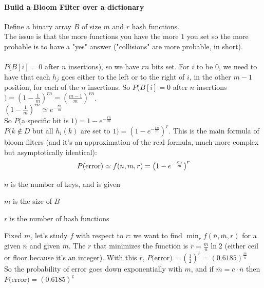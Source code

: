\documentclass[10pt]{report}
\begin{document}
\paragraph{Build a Bloom Filter over a dictionary} Define a binary array $B$ of size $m$ and $r$ hash functions.\\
The issue is that the more functions you have the more $1$ you set so the more probable is to have a "yes" answer ("collisions" are more probable, in short).\\\\
$P(B[i]=0$ after $n$ insertions$)$, so we have $rn$ bits set. For $i$ to be $0$, we need to have that each $h_j$ goes either to the left or to the right of $i$, in the other $m-1$ position, for each of the $n$ insertions. So $P(B[i]=0$ after $n$ insertions$) = \left(1-\frac{1}{m}\right)^{rn} = \left(\frac{m-1}{m}\right)^{rn}$.\\
$\left(1-\frac{1}{m}\right)^{rn}\simeq e^{-\frac{rn}{m}}$\\
So $P($a specific bit is $1) = 1-e^{-\frac{rn}{m}}$\\
$P(k\not\in D$ but all $h_i(k)$ are set to $1) = \left(1-e^{-\frac{rn}{m}}\right)^r$. This is the main formula of bloom filters (and it's an approximation of the real formula, much more complex but asymptotically identical): $$P(\hbox{error})\simeq f(n,m,r) = \left(1-e^{-\frac{rn}{m}}\right)^r$$
\begin{list}{}{}
	\item $n$ is the number of keys, and is given
	\item $m$ is the size of $B$
	\item $r$ is the number of hash functions
\end{list}
Fixed $m$, let's study $f$ with respect to $r$: we want to find $\min_r f(\overline{n},\overline{m},r)$ for a given $\overline{n}$ and given $\overline{m}$. The $r$ that minimizes the function is $\overline{r} = \frac{\overline{m}}{\overline{n}}\ln 2$ (either ceil or floor because it's an integer). With this $\overline{r}$, $P($error$)=\left(\frac{1}{2}\right)^{\overline{r}} = (0.6185)^{\frac{\overline{m}}{\overline{n}}}$\\
So the probability of error goes down exponentially with $m$, and if $\overline{m} = c\cdot\overline{n}$ then $P($error$)=(0.6185)^c$
\end{document}
